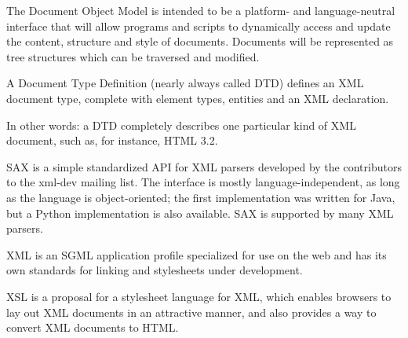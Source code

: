 \documentclass{howto}
\begin{document}
\begin{definitions}
%
The Document Object Model is intended to be a platform- and
language-neutral interface that will allow programs and scripts to
dynamically access and update the content, structure and style of
documents. Documents will be represented as tree structures which can
be traversed and modified.

%
A Document Type Definition (nearly always called DTD) defines
an XML document type, complete with element types, entities
and an XML declaration.
       
In other words: a DTD completely describes one particular kind
of XML document, such as, for instance, HTML 3.2.
        
%
SAX is a simple standardized API for XML parsers developed by the
contributors to the xml-dev mailing list. The interface is mostly
language-independent, as long as the language is object-oriented; the
first implementation was written for Java, but a Python implementation
is also available.  SAX is supported by many XML parsers.
          
%
XML is an SGML application profile specialized for use on the
web and has its own standards for linking and stylesheets under development.
          

%
XSL is a proposal for a stylesheet language for XML, which
enables browsers to lay out XML documents in an attractive
manner, and also provides a way to convert XML documents to
HTML.
\end{definitions}
          
%
\end{document}
